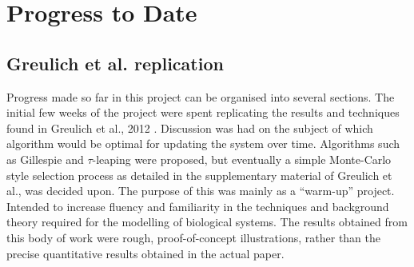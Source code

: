 \documentclass[a4paper,12pt]{article}
\begin{document}



% 
% 
% 

\section{Progress to Date}




\subsection{Greulich et al. replication}

Progress made so far in this project can be organised into several sections.  The initial few weeks of the project 
were spent replicating the results and techniques found in Greulich et al., 2012 \cite{bioref:PRL-drugGradients}.  Discussion was had
on the subject of which algorithm would be optimal for updating the system over time.  Algorithms such as Gillespie \cite{bioref:Gillespie-algorithm} 
and $\tau$-leaping \cite{bioref:tau-leap-algorithm} were proposed, but eventually a simple Monte-Carlo style selection process as detailed in the supplementary material 
of Greulich et al., was decided upon.  The purpose of this was mainly as a ``warm-up'' project.  Intended to increase fluency and familiarity in the techniques and background 
theory required for the modelling of biological systems.  The results obtained from this body of work were rough, proof-of-concept illustrations, rather than the precise 
quantitative results obtained in the actual paper.
\end{document}
